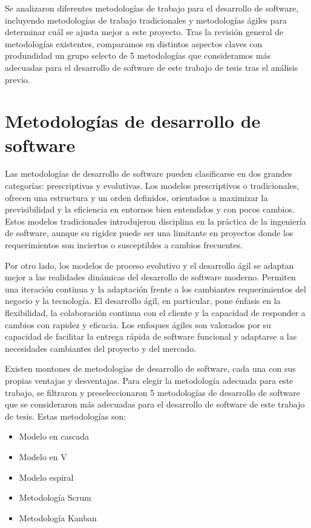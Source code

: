 Se analizaron diferentes metodologías de trabajo para el desarrollo de software, incluyendo metodologías de trabajo tradicionales y metodologías ágiles para determinar cuál se ajusta mejor a este proyecto. Tras la revisión general de metodologías existentes, comparamos en distintos aspectos claves con produndidad un grupo selecto de 5 metodologías que consideramos más adecuadas para el desarrollo de software de este trabajo de tesis tras el análisis previo. 

\section{Metodologías de desarrollo de software}

Las metodologías de desarrollo de software pueden clasificarse en dos grandes categorías: prescriptivas y evolutivas. Los modelos prescriptivos o tradicionales, ofrecen una estructura y un orden definidos, orientados a maximizar la previsibilidad y la eficiencia en entornos bien entendidos y con pocos cambios. Estos modelos tradicionales introdujeron disciplina en la práctica de la ingeniería de software, aunque su rigidez puede ser una limitante en proyectos donde los requerimientos son inciertos o susceptibles a cambios frecuentes.

Por otro lado, los modelos de proceso evolutivo y el desarrollo ágil se adaptan mejor a las realidades dinámicas del desarrollo de software moderno. Permiten una iteración continua y la adaptación frente a los cambiantes requerimientos del negocio y la tecnología. El desarrollo ágil, en particular, pone énfasis en la flexibilidad, la colaboración continua con el cliente y la capacidad de responder a cambios con rapidez y eficacia. Los enfoques ágiles son valorados por su capacidad de facilitar la entrega rápida de software funcional y adaptarse a las necesidades cambiantes del proyecto y del mercado.

Existen montones de metodologías de desarrollo de software, cada una con sus propias ventajas y desventajas. Para elegir la metodología adecuada para este trabajo, se filtraron y preseleccionaron 5 metodologías de desarrollo de software que se consideraron más adecuadas para el desarrollo de software de este trabajo de tesis. Estas metodologías son:

\begin{itemize}
		\item Modelo en cascada
		\item Modelo en V
		\item Modelo espiral
		\item Metodología Scrum
		\item Metodología Kanban
\end{itemize}

